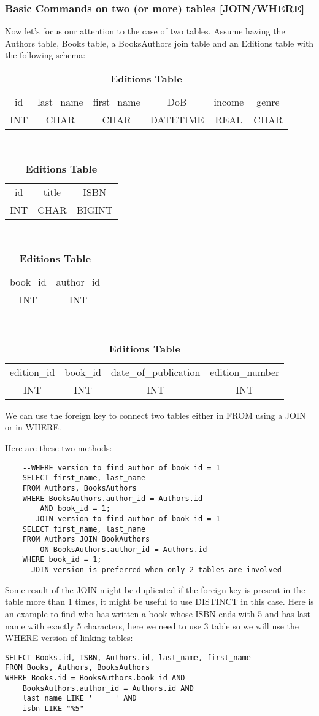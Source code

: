 \documentclass[a4page, 11pt]{article}
\begin{document}
\subsubsection{Basic Commands on two (or more) tables [JOIN/WHERE]}
Now let's focus our attention to the case of two tables. Assume having the Authors table, Books table, a BooksAuthors join table and an Editions table with the following schema:
\begin{table}[h]
	\centering
	\begin{tabular}{c c c c c c}
	id & last\_name & first\_name & DoB & income & genre\\
	INT & CHAR & CHAR & DATETIME & REAL & CHAR
	\end{tabular}
\caption*{\textbf{Authors Table}}
~\\
	\centering
	\begin{tabular}{c c c}
	id & title & ISBN\\
	INT & CHAR & BIGINT
	\end{tabular}
\caption*{\textbf{Books Table}}
~\\
	\centering
	\begin{tabular}{c c}
	book\_id & author\_id\\
	INT & INT
	\end{tabular}
\caption*{\textbf{BooksAuthors Table}}
~\\
	\begin{tabular}{c c c c}
	edition\_id & book\_id & date\_of\_publication & edition\_number\\
	INT & INT & INT & INT
\end{tabular}
\caption*{\textbf{Editions Table}}
\end{table}

We can use the foreign key to connect two tables either in FROM using a JOIN or in WHERE.

Here are these two methods:

\begin{lstlisting}
	--WHERE version to find author of book_id = 1
	SELECT first_name, last_name
	FROM Authors, BooksAuthors
	WHERE BooksAuthors.author_id = Authors.id
		AND book_id = 1;
	-- JOIN version to find author of book_id = 1
	SELECT first_name, last_name
	FROM Authors JOIN BookAuthors
		ON BooksAuthors.author_id = Authors.id
	WHERE book_id = 1;
	--JOIN version is preferred when only 2 tables are involved
\end{lstlisting}

Some result of the JOIN might be duplicated if the foreign key is present in the table more than 1 times, it might be useful to use DISTINCT in this case.
Here is an example to find who has written a book whose ISBN ends with 5 and has last name with exactly 5 characters, here we need to use 3 table so we will use the WHERE version of linking tables:
\begin{lstlisting}
SELECT Books.id, ISBN, Authors.id, last_name, first_name
FROM Books, Authors, BooksAuthors
WHERE Books.id = BooksAuthors.book_id AND
	BooksAuthors.author_id = Authors.id AND
	last_name LIKE '_____' AND
	isbn LIKE "%5"
\end{lstlisting}
\end{document}
